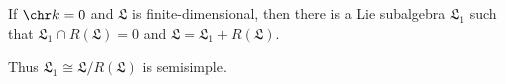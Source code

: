 If $\chr k = 0$ and $\mathfrak{L}$ is finite-dimensional, then there is
a Lie subalgebra $\mathfrak{L}_1$ such that $\mathfrak{L}_1 \cap R(\mathfrak{L}) = 0$
and $\mathfrak{L} = \mathfrak{L}_1 + R(\mathfrak{L})$.

Thus $\mathfrak{L}_1\cong \mathfrak{L}/R(\mathfrak{L})$ is semisimple.
